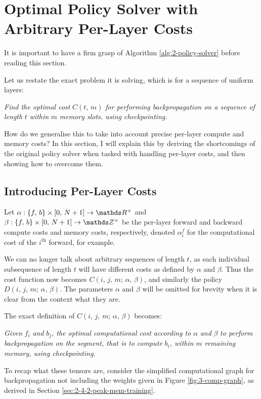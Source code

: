 \section{Optimal Policy Solver with Arbitrary Per-Layer Costs} \label{sec:3-policy-solver}
It is important to have a firm grasp of Algorithm \ref{alg:2-policy-solver} before reading this section.

Let us restate the exact problem it is solving, which is for a sequence of uniform layers:

\textit{Find the optimal cost }\(C(t,\,m)\)\textit{ for performing backpropagation on a sequence of length }\(t\)\textit{ within }\(m\)\textit{ memory slots, using checkpointing.}

How do we generalise this to take into account precise per-layer compute and memory costs?
In this section, I will explain this by deriving the shortcomings of the original policy solver when tasked with handling per-layer costs, and then showing how to overcome them.

\subsection{Introducing Per-Layer Costs}
Let \(\alpha : \{f,\, b\}\times[0,\, N+1] \rightarrow \R^+\) and \(\beta : \{f,\, b\}\times[0,\, N+1] \rightarrow \Z^+\) be the per-layer forward and backward compute costs and memory costs, respectively, denoted \(\alpha^f_i\) for the computational cost of the \(i^\mathrm{th}\) forward, for example.

We can no longer talk about arbitrary sequences of length \(t\), as each individual subsequence of length \(t\) will have different costs as defined by \(\alpha\) and \(\beta\).
Thus the cost function now becomes \(C(i,\, j,\, m;\, \alpha,\, \beta)\), and similarly the policy \(D(i,\, j,\, m;\, \alpha,\, \beta)\).
The parameters \(\alpha\) and \(\beta\) will be omitted for brevity when it is clear from the context what they are.

The exact definition of \(C(i,\, j,\, m;\, \alpha,\, \beta)\) becomes:

\textit{Given }\(f_i\)\textit{ and }\(b_j\)\textit{, the optimal computational cost according to }\(\alpha\)\textit{ and }\(\beta\)\textit{ to perform backpropagation on the segment, that is to compute }\(b_i\)\textit{, within }\(m\)\textit{ remaining memory, using checkpointing.}

To recap what these tensors are, consider the simplified computational graph for backpropagation not including the weights given in Figure \ref{fig:3-comp-graph}, as derived in Section \ref{sec:2-4-2-peak-mem-training}.


